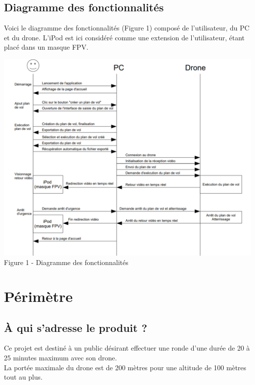 \documentclass{article}
\begin{document}
     \newpage
	 \subsection{Diagramme des fonctionnalités}
	    Voici le diagramme des fonctionnalités (Figure 1) composé de l'utilisateur, du PC et du drone. L'iPod est ici considéré comme une extension de l'utilisateur, étant placé dans un masque FPV.\\
	    
	    
		\begin{center}
		\includegraphics[scale=0.8]{diagramme_services_2.PNG}\\
		 \vspace*{0.3cm}
		Figure 1 - Diagramme des fonctionnalités
		\end{center}
		
			
\section{Périmètre}
	\subsection{À qui s'adresse le produit ?}
		Ce projet est destiné à un public désirant effectuer une ronde d'une durée de 20 à 25 minutes maximum avec son drone.\\
		La portée maximale du drone est de 200 mètres pour une altitude de 100 mètres tout au plus.
	
\end{document}
